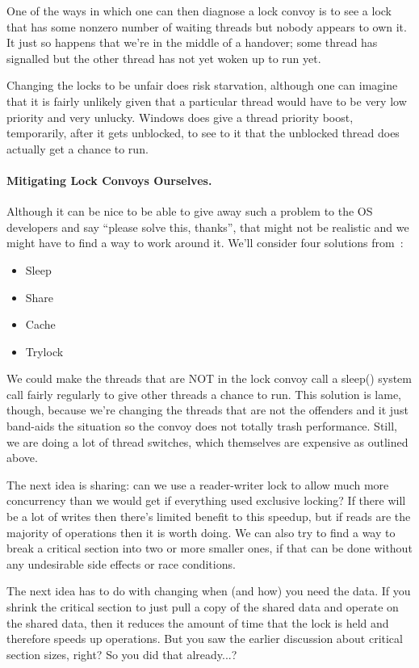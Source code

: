 \documentclass[a4paper]{report}
\begin{document}
One of the ways in which one can then diagnose a lock convoy is to see a lock that has some nonzero number of waiting threads but nobody appears to own it. It just so happens that we're in the middle of a handover; some thread has signalled but the other thread has not yet woken up to run yet.

Changing the locks to be unfair does risk starvation, although one can imagine that it is fairly unlikely given that a particular thread would have to be very low priority and very unlucky. Windows does give a thread priority boost, temporarily, after it gets unblocked, to see to it that the unblocked thread does actually get a chance to run.

\paragraph{Mitigating Lock Convoys Ourselves.} Although it can be nice to be able to give away such a problem to the OS developers and say ``please solve this, thanks'', that might not be realistic and we might have to find a way to work around it. We'll consider four solutions from~\cite{lockconvoys}:

\begin{itemize}
	\item Sleep
	\item Share
	\item Cache
	\item Trylock
\end{itemize}

We could make the threads that are NOT in the lock convoy call a sleep() system call fairly regularly to give other threads a chance to run. This solution is lame, though, because we're changing the threads that are not the offenders and it just band-aids the situation so the convoy does not totally trash performance. Still, we are doing a lot of thread switches, which themselves are expensive as outlined above.

The next idea is sharing: can we use a reader-writer lock to allow much more concurrency than we would get if everything used exclusive locking? If there will be a lot of writes then there's limited benefit to this speedup, but if reads are the majority of operations then it is worth doing. We can also try to find a way to break a critical section into two or more smaller ones, if that can be done without any undesirable side effects or race conditions.

The next idea has to do with changing when (and how) you need the data. If you shrink the critical section to just pull a copy of the shared data and operate on the shared data, then it reduces the amount of time that the lock is held and therefore speeds up operations. But you saw the earlier discussion about critical section sizes, right? So you did that already...?
\end{document}
